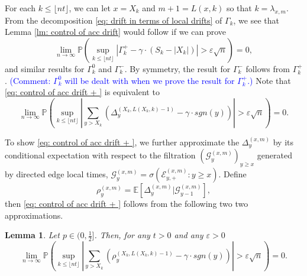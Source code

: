 \documentclass[twoside,12pt, a4paper]{article}
\newtheorem{lemma}{Lemma}[section]
\numberwithin{equation}{section}
\theoremstyle{remark}
\newcommand{\abs}[1]{\left\vert #1 \right\vert}
\newcommand{\comment}[1]{\textcolor{blue}{(Comment: #1)}}
\begin{document}
	For each $k\leq \lfloor nt\rfloor$, we can let $x = X_k$ and $ m +1=L(x,k)$ so that $k = \lambda_{x,m}$. From the decomposition \eqref{eq: drift in terms of local drifts} of $\Gamma_k$, we see that
	Lemma \ref{lm: control of acc drift} would follow if we can prove
	\begin{equation}\label{eq: control of acc drift + }
		\lim_{n \to \infty }\mathbb{P}\left(\sup_{k\leq\lfloor nt \rfloor} \abs{\Gamma^+_k - \gamma \cdot \left(S_k - \abs{X_k} \right)   } > \varepsilon \sqrt{n}  \right) =0, 
	\end{equation}
	and similar results for $\Gamma_k^0$ and $\Gamma_k^-$. By symmetry, the result for $\Gamma_k^-$ follows from $\Gamma_k^+$. 
	\comment{$\Gamma_k^0$ will be dealt with when we prove the result for $\Gamma_k^+$.}
	Note that \eqref{eq: control of acc drift + } is equivalent to
	\begin{equation}
		\lim_{n \to \infty }\mathbb{P}\left(\sup_{k\leq\lfloor nt \rfloor} \abs{\sum_{y> X_k} \left( \Delta_{y}^{(X_k,L(X_k,k) - 1)} - \gamma  \cdot sgn(y) \right)   }  > \varepsilon \sqrt{n}  \right) =0. 
	\end{equation}

	To show \eqref{eq: control of acc drift + }, we further approximate the $\Delta_{y}^{(x,m)}$ by its conditional expectation with respect to the filtration $\left(\mathcal{G}_{y}^{(x,m)}\right)_{y\geq x}$ generated by directed edge local times, $ \mathcal{G}_{y}^{(x,m)} = \sigma\left( \mathcal{E}^{(x,m)}_{y,+} : y \geq x \right)$.
	Define
	\begin{equation}\label{eq: conditional mean}
		\rho_{y}^{(x,m)}= \mathbb{E}\left[\Delta_y^{(x,m)} | \mathcal{G}_{y-1}^{(x,m)}\right],
	\end{equation}
	then \eqref{eq: control of acc drift + } follows from the following two two approximations.
	\begin{lemma}\label{lm: approximation of means of local drift}
		Let $p\in (0,\frac{1}{2}]$. Then, for any $t>0$ and any $\varepsilon >0$
		\begin{equation}\label{eq: control of expected local drift}
			\lim_{n \to \infty }\mathbb{P}\left(\sup_{k\leq\lfloor nt \rfloor} \abs{\sum_{y> X_k} \left( \rho_{y}^{(X_k,L(X_k,k)-1)} - \gamma  \cdot sgn(y) \right)   }  > \varepsilon \sqrt{n}  \right) =0. 
		\end{equation}
	\end{lemma}
	
\end{document}
